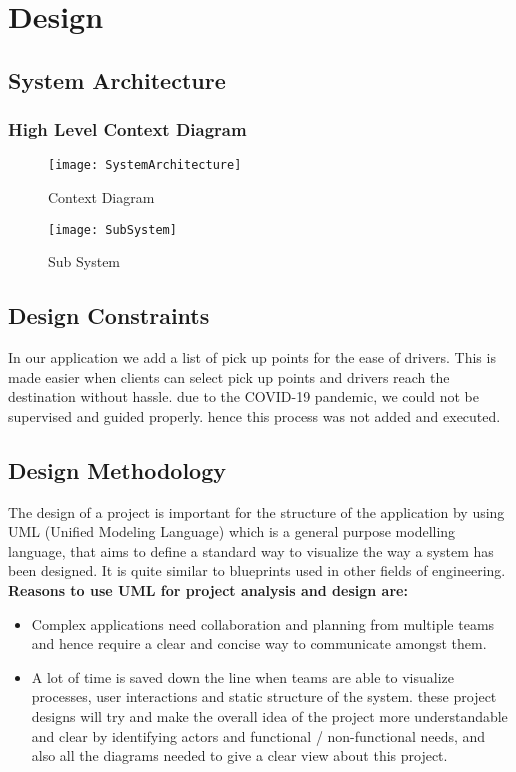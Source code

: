 \chapter{Design} \label{chap:design}

\section{System Architecture}
  
\subsection{High Level Context Diagram}
\begin{figure}[ht]
\center
\texttt{[image: SystemArchitecture]}
\caption{Context Diagram}
\label{fig:Context Diagram}
\end{figure}
\begin{figure}[ht]
\center
\texttt{[image: SubSystem]}
\caption{Sub System}
\label{fig:SubSystem}
\end{figure}

\section{Design Constraints} 
In our application we add a list of pick up points for the ease of drivers. This is made easier when clients can select pick up points and drivers reach the destination without hassle. due to the COVID-19 pandemic, we could not be supervised and guided properly. hence this process was not added and executed.
\section{Design Methodology}
The design of a project is important for the structure of the application by using UML (Unified Modeling Language) which is a general purpose modelling language, that aims to define a standard way to visualize the way a system has been designed. It is quite similar to blueprints used in other fields of engineering.
\\ \textbf{Reasons to use UML for project analysis and design are:} 

\begin{itemize}
\item Complex applications need collaboration and planning from multiple teams and hence require a clear and concise way to communicate amongst them.
\item A lot of time is saved down the line when teams are able to visualize processes, user interactions and static structure of the system. these project designs will try and make the overall idea of the project more understandable and clear by identifying actors and functional / non-functional needs, and also all the diagrams needed to give a clear view about this project.
\end{itemize}



